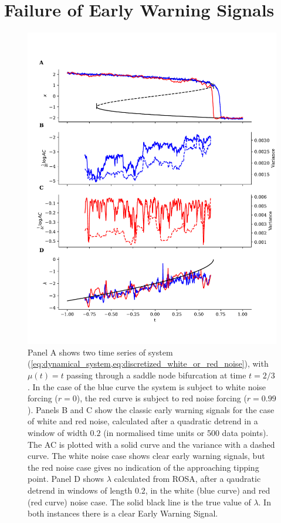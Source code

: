\section{Failure of Early Warning Signals}\label{sec:failure}
\begin{figure}
\includegraphics[width=\textwidth,keepaspectratio]{figure1}
\caption[Early Warning Signals Failing]
{Panel A shows two time series of system (\cref{eq:dynamical_system,eq:discretized_white_or_red_noise}), with $\mu(t)=t$ passing through a saddle node bifurcation at time $t=2/3$. 
  In the case of the blue curve the system
  is subject to white noise forcing ($r=0$), the red curve is subject to 
  red noise forcing ($r=0.99$). Panels B and C show the
  classic early warning signals for the case of white and
  red noise, calculated after a
  quadratic detrend in a window of width $0.2$ (in normalised time units or 500 data points).
  The AC is plotted with a solid curve and
  the variance with a 
  dashed curve.
  The white noise case shows clear early warning signals, 
  but the red noise case gives no indication of the approaching tipping point. Panel D shows $\lambda$ calculated from ROSA, after a
  qaudratic detrend in windows of length $0.2$, in the
  white (blue curve) and red (red curve) noise case. The solid black 
  line is the true value of $\lambda$. In both instances there
  is a clear Early Warning Signal.}\label{fig:failure_of_ews}
\end{figure}

